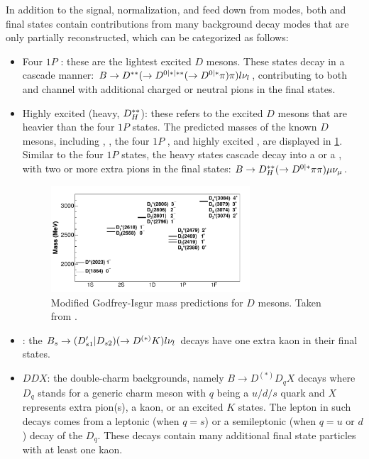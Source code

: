 In addition to the signal, normalization, and feed down from \Dstar modes,
both \Dstarp\mun and \Dz\mun final states contain contributions from many
background decay modes that are only partially reconstructed,
which can be categorized as follows:
\begin{itemize}
    \item Four $1P$ \Dstst:
        these are the lightest excited $D$ mesons.
        These \Dstst states decay in a cascade manner:
        $B \rightarrow D^{**}
        (\rightarrow D^{0|*|**} (\rightarrow D^{0|*}\pi) \pi)
        l{{\nu}_l}$,
        contributing to both \Dz and \Dstar channel with additional
        charged or neutral pions in the final states.
    \item Highly excited \Dstst (\Dstst heavy, $D^{**}_H$):
        these refers to the excited $D$ mesons that are heavier than the four
        $1P$ \Dstst states.
        The predicted masses of
        the known $D$ mesons, including \Dz, \Dstar, the four $1P$ \Dstst,
        and highly excited \Dstst,
        are displayed in \cref{fig:excited-d-meson}.
        Similar to the four $1P$ \Dstst states,
        the \Dstst heavy states cascade decay into a \Dz or a \Dstar,
        with two or more extra pions in the final states:
        $B \rightarrow D^{**}_H (\rightarrow D^{0|*} \pi\pi) \mu{\ensuremath{{\nu}_\mu}}$.

\begin{figure}[!htb]
    \centering
    \includegraphics[width=0.7\textwidth]{figs-analysis-overview/d_meson_predicted_masses.pdf}
    \caption{
        Modified Godfrey-Isgur mass predictions for $D$ mesons.
        Taken from \cite{D_mesons_2013}.
    }
    \label{fig:excited-d-meson}
\end{figure}

    \item \DststS:
        the $B_s \rightarrow (D'_{s1}|D_{s2})
        (\rightarrow D^{(*)}K) l{{\nu}_l}$
        decays have one extra kaon in their final states.
    \item $DDX$:
        the double-charm backgrounds,
        namely $B \rightarrow D^{(*)} D_q X$ decays
        where $D_q$ stands for a generic charm meson with $q$ being a
        $u/d/s$ quark and $X$ represents extra pion(s), a kaon, or an
        excited $K$ states.
        The lepton in such decays comes from
        a leptonic (when $q = s$) or a semileptonic
        (when $q = u \text{ or } d$) decay of the $D_q$.
        These decays contain many additional final state particles with at least
        one kaon.
\end{itemize}

